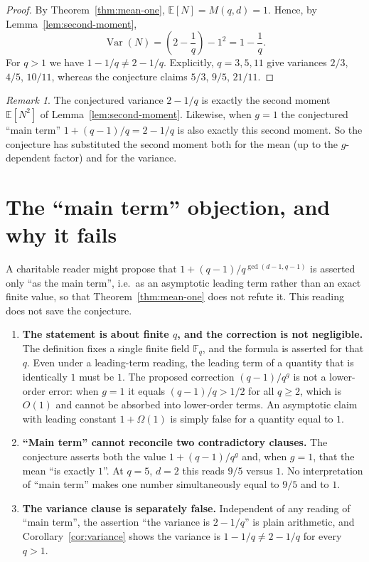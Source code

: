 \documentclass[11pt]{article}
\theoremstyle{definition}
\theoremstyle{remark}
\newtheorem{remark}[theorem]{Remark}
\begin{document}
\begin{proof}
By Theorem~\ref{thm:mean-one}, $\mathbb{E}[N] = M(q,d) = 1$. Hence, by
Lemma~\ref{lem:second-moment},
\[
\operatorname{Var}(N) = \left(2-\frac1q\right) - 1^2 = 1 - \frac{1}{q}.
\]
For $q>1$ we have $1 - 1/q \ne 2 - 1/q$. Explicitly, $q=3,5,11$ give variances
$2/3$, $4/5$, $10/11$, whereas the conjecture claims $5/3$, $9/5$, $21/11$.
\end{proof}

\begin{remark}
The conjectured variance $2-1/q$ is exactly the second moment
$\mathbb{E}[N^2]$ of Lemma~\ref{lem:second-moment}. Likewise, when $g=1$ the
conjectured ``main term'' $1+(q-1)/q = 2-1/q$ is also exactly this second moment.
So the conjecture has substituted the second moment both for the mean (up to the
$g$-dependent factor) and for the variance.
\end{remark}

\section{The ``main term'' objection, and why it fails}

A charitable reader might propose that $1 + (q-1)/q^{\gcd(d-1,q-1)}$ is asserted
only ``as the main term'', i.e.\ as an asymptotic leading term rather than an exact
finite value, so that Theorem~\ref{thm:mean-one} does not refute it. This reading
does not save the conjecture.

\begin{enumerate}
\item \textbf{The statement is about finite $q$, and the correction is not
negligible.} The definition fixes a single finite field $\mathbb{F}_q$, and the
formula is asserted for that $q$. Even under a leading-term reading, the leading
term of a quantity that is identically $1$ must be $1$. The proposed correction
$(q-1)/q^{g}$ is not a lower-order error: when $g=1$ it equals $(q-1)/q > 1/2$ for
all $q \ge 2$, which is $O(1)$ and cannot be absorbed into lower-order terms. An
asymptotic claim with leading constant $1 + \Omega(1)$ is simply false for a
quantity equal to $1$.
\item \textbf{``Main term'' cannot reconcile two contradictory clauses.} The
conjecture asserts both the value $1+(q-1)/q^{g}$ and, when $g=1$, that the mean
``is exactly $1$''. At $q=5$, $d=2$ this reads $9/5$ versus $1$. No interpretation
of ``main term'' makes one number simultaneously equal to $9/5$ and to $1$.
\item \textbf{The variance clause is separately false.} Independent of any reading
of ``main term'', the assertion ``the variance is $2-1/q$'' is plain arithmetic,
and Corollary~\ref{cor:variance} shows the variance is $1-1/q \ne 2-1/q$ for every
$q>1$.
\end{enumerate}
\end{document}
